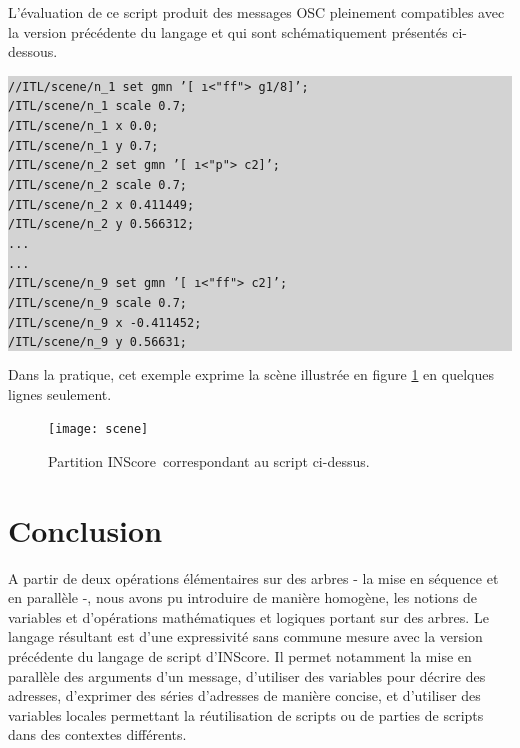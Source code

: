 \documentclass{article}
\newcommand{\IS}		{INScore}
\newcommand{\code}	[2][0.9]	{\vspace{0mm}\begin{center}\colorbox{lightgrey}{
							\begin{minipage}[t]{#1\columnwidth} 
							{\small \texttt{#2}}
							\end{minipage}}\end{center}}
\begin{document}
L'évaluation de ce script produit des messages OSC pleinement compatibles avec la version précédente du langage et qui sont schématiquement présentés ci-dessous. 
\code[1]{//ITL/scene/n\_1 set gmn '[ \i<"ff"> g1/8]';\\
/ITL/scene/n\_1 scale 0.7;\\
/ITL/scene/n\_1 x 0.0;\\
/ITL/scene/n\_1 y 0.7;\\
/ITL/scene/n\_2 set gmn '[ \i<"p"> c2]';\\
/ITL/scene/n\_2 scale 0.7;\\
/ITL/scene/n\_2 x 0.411449;\\
/ITL/scene/n\_2 y 0.566312;\\
...\\
...\\
/ITL/scene/n\_9 set gmn '[ \i<"ff"> c2]';\\
/ITL/scene/n\_9 scale 0.7;\\
/ITL/scene/n\_9 x -0.411452;\\
/ITL/scene/n\_9 y 0.56631;
}


Dans la pratique, cet exemple exprime la scène illustrée en figure \ref{samplescene} en quelques lignes seulement.

\begin{figure}[htbp]
\begin{center}
\texttt{[image: scene]}
\caption{Partition \IS\ correspondant au script ci-dessus.}
\label{samplescene}
\end{center}
\end{figure}


\section{Conclusion}

A partir de deux opérations élémentaires sur des arbres - la mise en séquence et en parallèle -, nous avons pu introduire de manière homogène, les notions de variables et d'opérations mathématiques et logiques portant sur des arbres. Le langage résultant est d'une  expressivité sans commune mesure avec la version précédente du langage de script d'\IS . Il permet notamment la mise en parallèle des arguments d'un message, d'utiliser des variables pour décrire des adresses, d'exprimer des séries d'adresses de manière concise, et d'utiliser des variables locales permettant la réutilisation de scripts ou de parties de scripts dans des contextes différents.

\balance


\end{document}
